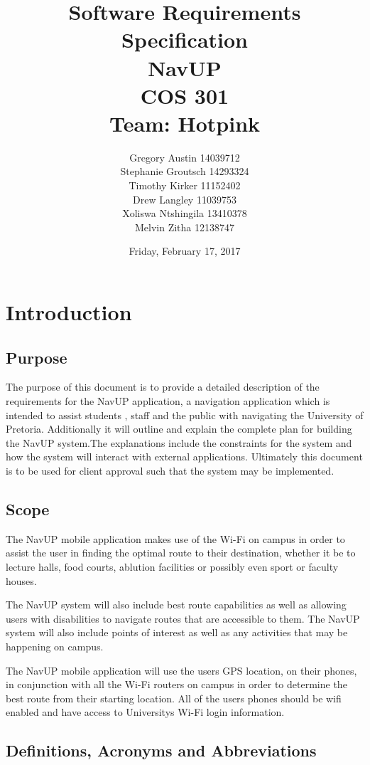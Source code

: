 \documentclass[11pt,a4paper]{article}
\title{Software Requirements Specification \\ NavUP \\ COS 301 \\ Team: Hotpink}
\date{Friday, February 17, 2017}
\author{Gregory Austin 14039712 \\ Stephanie Groutsch 14293324 \\ Timothy Kirker 11152402 \\ Drew Langley 11039753 \\ Xoliswa Ntshingila 13410378
\\ Melvin Zitha 12138747}
\begin{document}
\maketitle


\newpage
\section{Introduction}
	\subsection{Purpose}
	The purpose of this document is to provide a detailed description of the requirements for the NavUP application, a navigation application which is intended to assist students , staff and the  public with navigating the University of Pretoria. Additionally it will outline and explain the complete plan for building the NavUP system.The explanations include the constraints for the system and how the system will interact with external applications. Ultimately this document is to be used for client approval such that the system may be implemented.


	\subsection{Scope}
	The NavUP mobile application makes use of the Wi-Fi on campus in order to assist the user in finding the optimal route to their destination, whether it be to lecture halls, food courts, ablution facilities or possibly even sport or faculty houses.

	The NavUP system will also include best route capabilities as well as allowing users with disabilities to navigate routes that are accessible to them. The NavUP system will also include points of interest as well as any activities that may be happening on campus.

	The NavUP mobile application will use the users GPS location, on their phones, in conjunction with all the Wi-Fi routers on campus in order to determine the best route from their starting location. All of the users phones should be wifi enabled and have access to Universitys Wi-Fi login information.
	\subsection{Definitions, Acronyms and Abbreviations}
\end{document}
